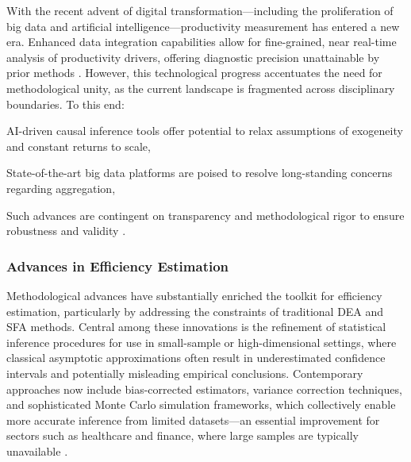\documentclass[sigconf]{acmart}
\begin{document}
With the recent advent of digital transformation—including the proliferation of big data and artificial intelligence—productivity measurement has entered a new era. Enhanced data integration capabilities allow for fine-grained, near real-time analysis of productivity drivers, offering diagnostic precision unattainable by prior methods \cite{ref86}. However, this technological progress accentuates the need for methodological unity, as the current landscape is fragmented across disciplinary boundaries. To this end:

AI-driven causal inference tools offer potential to relax assumptions of exogeneity and constant returns to scale,

State-of-the-art big data platforms are poised to resolve long-standing concerns regarding aggregation,

Such advances are contingent on transparency and methodological rigor to ensure robustness and validity \cite{ref86}.

\subsubsection{Advances in Efficiency Estimation}

Methodological advances have substantially enriched the toolkit for efficiency estimation, particularly by addressing the constraints of traditional DEA and SFA methods. Central among these innovations is the refinement of statistical inference procedures for use in small-sample or high-dimensional settings, where classical asymptotic approximations often result in underestimated confidence intervals and potentially misleading empirical conclusions. Contemporary approaches now include bias-corrected estimators, variance correction techniques, and sophisticated Monte Carlo simulation frameworks, which collectively enable more accurate inference from limited datasets—an essential improvement for sectors such as healthcare and finance, where large samples are typically unavailable \cite{ref87}.
\end{document}
